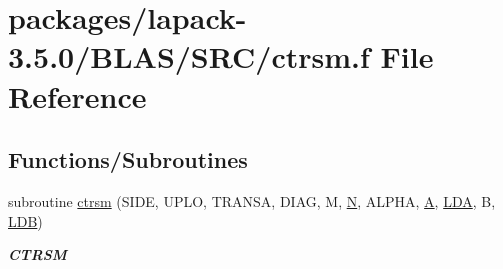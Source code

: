 \hypertarget{lapack-3_85_80_2BLAS_2SRC_2ctrsm_8f}{}\section{packages/lapack-\/3.5.0/\+B\+L\+A\+S/\+S\+R\+C/ctrsm.f File Reference}
\label{lapack-3_85_80_2BLAS_2SRC_2ctrsm_8f}
\subsection*{Functions/\+Subroutines}
\begin{DoxyCompactItemize}
\item 
subroutine \hyperlink{group__complex__blas__level3_gaf33844c7fd27e5434496d2ce0c1fc9d4}{ctrsm} (S\+I\+D\+E, U\+P\+L\+O, T\+R\+A\+N\+S\+A, D\+I\+A\+G, M, \hyperlink{polmisc_8c_a0240ac851181b84ac374872dc5434ee4}{N}, A\+L\+P\+H\+A, \hyperlink{classA}{A}, \hyperlink{example__user_8c_ae946da542ce0db94dced19b2ecefd1aa}{L\+D\+A}, B, \hyperlink{example__user_8c_a50e90a7104df172b5a89a06c47fcca04}{L\+D\+B})
\begin{DoxyCompactList}\small\item\em {\bfseries C\+T\+R\+S\+M} \end{DoxyCompactList}\end{DoxyCompactItemize}

